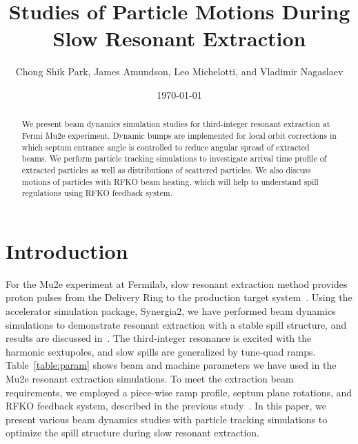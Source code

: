 \documentclass[aps,prstab,onecolumn,preprint]{revtex4-1}
\begin{document}
\title{Studies of Particle Motions During Slow Resonant Extraction}
\author{Chong Shik Park, James Amundson, Leo Michelotti, and Vladimir Nagaslaev}
\date{\today}

\begin{abstract}
We present beam dynamics simulation studies for third-integer resonant extraction at Fermi Mu2e experiment. Dynamic bumps are implemented for local orbit corrections in which septum entrance angle is controlled to reduce angular spread of extracted beams. We perform particle tracking simulations to investigate arrival time profile of extracted particles as well as distributions of scattered particles. We also discuss motions of particles with RFKO beam heating, which will help to understand spill regulations using RFKO feedback system.
\end{abstract}

\pacs{}
\maketitle

\setcounter{tocdepth}{7}


\section{\label{sec:intro}Introduction}

For the Mu2e experiment at Fermilab, slow resonant extraction method provides proton pulses from the Delivery Ring to the production target system~\cite{tdr}. Using the accelerator simulation package, Synergia2, we have performed beam dynamics simulations to demonstrate resonant extraction with a stable spill structure, and results are discussed in~\cite{mu2e}. The third-integer resonance is excited with the harmonic sextupoles, and slow spills are generalized by tune-quad ramps. Table~\ref{table:param} shows beam and machine parameters we have used in the Mu2e resonant extraction simulations. To meet the extraction beam requirements, we employed a piece-wise ramp profile, septum plane rotations, and RFKO feedback system, described in the previous study~\cite{mu2e}. In this paper, we present various beam dynamics studies with particle tracking simulations to optimize the spill structure during slow resonant extraction. 
\end{document}
